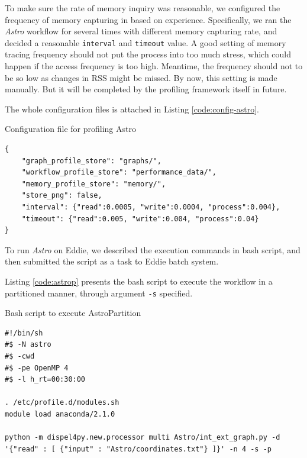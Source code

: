 \documentclass[10pt,twoside,openright,logo]{report}
\begin{document}
To make sure the rate of memory inquiry was reasonable, we configured the frequency of memory capturing in \textit{} based on experience. Specifically, we ran the \textit{Astro} workflow for several times with different memory capturing rate, and decided a reasonable \texttt{interval} and \texttt{timeout} value. A good setting of memory tracing frequency should not put the process into too much stress, which could happen if the access frequency is too high. Meantime, the frequency should not to be so low as changes in RSS might be missed. By now, this setting is made manually. But it will be completed by the profiling framework itself in future.

The whole configuration files is attached in Listing \ref{code:config-astro}.
\begin{listing}
\caption{Configuration file for profiling Astro}
\label{code:config-astro}
\begin{verbatim}
{
    "graph_profile_store": "graphs/",
    "workflow_profile_store": "performance_data/",
    "memory_profile_store": "memory/",
    "store_png": false,
    "interval": {"read":0.0005, "write":0.0004, "process":0.004},
    "timeout": {"read":0.005, "write":0.004, "process":0.04}
}
\end{verbatim}
\end{listing}

To run \textit{Astro} on Eddie, we described the execution commands in bash script, and then submitted the script as a task to Eddie batch system.

Listing \ref{code:astrop} presents the bash script to execute the workflow in a partitioned manner, through argument \texttt{-s} specified.
\begin{listing}
\caption{Bash script to execute AstroPartition}
\label{code:astrop}
\begin{verbatim}
#!/bin/sh
#$ -N astro
#$ -cwd
#$ -pe OpenMP 4
#$ -l h_rt=00:30:00

. /etc/profile.d/modules.sh
module load anaconda/2.1.0

python -m dispel4py.new.processor multi Astro/int_ext_graph.py -d '{"read" : [ {"input" : "Astro/coordinates.txt"} ]}' -n 4 -s -p
\end{verbatim}
\end{listing}
\end{document}
